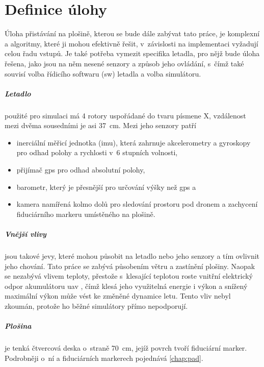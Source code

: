 \chapter{Definice úlohy} \label{chap:task}
Úloha přistávání na plošině, kterou se bude dále zabývat tato práce, je komplexní a algoritmy, které ji mohou efektivně řešit, v~závislosti na implementaci vyžadují celou řadu vstupů. Je také potřeba vymezit specifika letadla, pro nějž bude úloha řešena, jako jsou na něm nesené senzory a způsob jeho ovládání, s~čímž také souvisí volba řídicího softwaru (\acrshort{sw}) letadla a volba simulátoru.

\paragraph{Letadlo} použité pro simulaci má 4 rotory uspořádané do tvaru písmene X, vzdálenost mezi dvěma sousedními je asi 37~cm. Mezi jeho senzory patří \begin{itemize}
    \item inerciální měřicí jednotka (\acrshort{imu}), která zahrnuje akcelerometry a gyroskopy pro odhad polohy a rychlosti v~6 stupních volnosti, 
    \item přijímač \acrshort{gps} pro odhad absolutní polohy, 
    \item barometr, který je přesnější pro určování výšky než \acrshort{gps} a 
    \item kamera namířená kolmo dolů pro sledování prostoru pod dronem a zachycení fiduciárního markeru umístěného na plošině.
\end{itemize}

\paragraph{Vnější vlivy} jsou takové jevy, které mohou působit na letadlo nebo jeho senzory a tím ovlivnit jeho chování. Tato práce se zabývá působením větru a zastínění plošiny. Naopak se nezabývá vlivem teploty, přestože s~klesající teplotou roste vnitřní elektrický odpor akumulátoru \acrshort{uav} \cite{lipo}, čímž klesá jeho využitelná energie i výkon a snížený maximální výkon může vést ke změněné dynamice letu. Tento vliv nebyl zkoumán, protože ho běžné simulátory přímo nepodporují.

\paragraph{Plošina} je tenká čtvercová deska o~straně 70~cm, jejíž povrch tvoří fiduciární marker. Podrobněji o~ní a fiduciárních markerech pojednává \cref{chap:pad}.

